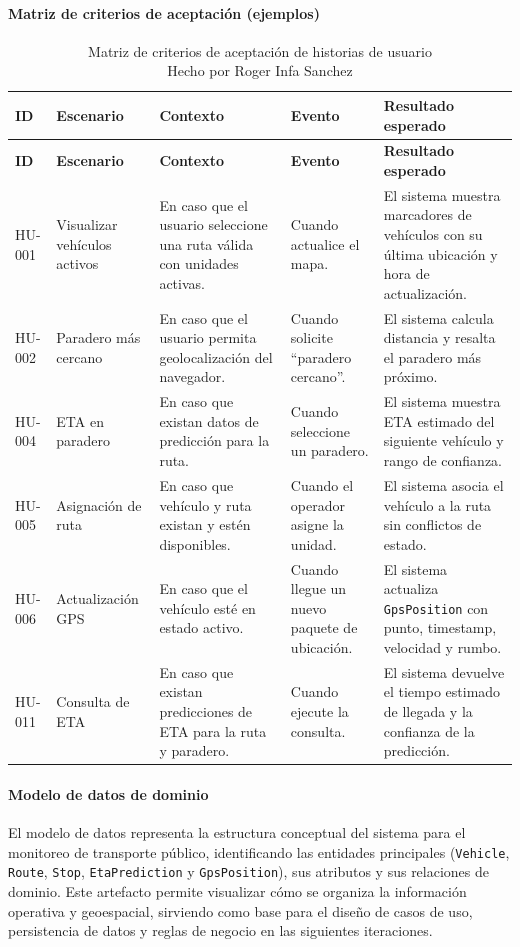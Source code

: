 \paragraph{Matriz de criterios de aceptación (ejemplos)}
\begin{longtable}{|p{}|p{}|p{}|p{}|p{}|}
\caption{Matriz de criterios de aceptación de historias de usuario\\Hecho por Roger Infa Sanchez} \\
\hline
\textbf{ID} & \textbf{Escenario} & \textbf{Contexto} & \textbf{Evento} & \textbf{Resultado esperado} \\
\hline
\endfirsthead
\hline
\textbf{ID} & \textbf{Escenario} & \textbf{Contexto} & \textbf{Evento} & \textbf{Resultado esperado} \\
\hline
\endhead
HU-001 & Visualizar vehículos activos & En caso que el usuario seleccione una ruta válida con unidades activas. & Cuando actualice el mapa. & El sistema muestra marcadores de vehículos con su última ubicación y hora de actualización. \\
\hline
HU-002 & Paradero más cercano & En caso que el usuario permita geolocalización del navegador. & Cuando solicite ``paradero cercano''. & El sistema calcula distancia y resalta el paradero más próximo. \\
\hline
HU-004 & ETA en paradero & En caso que existan datos de predicción para la ruta. & Cuando seleccione un paradero. & El sistema muestra ETA estimado del siguiente vehículo y rango de confianza. \\
\hline
HU-005 & Asignación de ruta & En caso que vehículo y ruta existan y estén disponibles. & Cuando el operador asigne la unidad. & El sistema asocia el vehículo a la ruta sin conflictos de estado. \\
\hline
HU-006 & Actualización GPS & En caso que el vehículo esté en estado activo. & Cuando llegue un nuevo paquete de ubicación. & El sistema actualiza \texttt{GpsPosition} con punto, timestamp, velocidad y rumbo. \\
\hline
HU-011 & Consulta de ETA & En caso que existan predicciones de ETA para la ruta y paradero. & Cuando ejecute la consulta. & El sistema devuelve el tiempo estimado de llegada y la confianza de la predicción. \\
\hline
\end{longtable}

\paragraph{Modelo de datos de dominio}
El modelo de datos representa la estructura conceptual del sistema para el monitoreo de transporte público, identificando las entidades principales (\texttt{Vehicle}, \texttt{Route}, \texttt{Stop}, \texttt{EtaPrediction} y \texttt{GpsPosition}), sus atributos y sus relaciones de dominio. Este artefacto permite visualizar cómo se organiza la información operativa y geoespacial, sirviendo como base para el diseño de casos de uso, persistencia de datos y reglas de negocio en las siguientes iteraciones.

